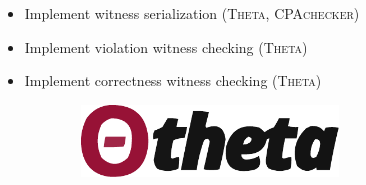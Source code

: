 
\begin{itemize}
    \item Implement witness serialization (\textsc{Theta}, \textsc{CPAchecker})
    \item Implement violation witness checking (\textsc{Theta})
    \item Implement correctness witness checking (\textsc{Theta})
\end{itemize}

\begin{figure}[H]
\centering
\begin{subfigure}{0.5\columnwidth}
\centering

\end{subfigure}%
\begin{subfigure}{0.5\columnwidth}
            \centering
            
\includegraphics[width=0.75\textwidth]{logos/theta-logo.pdf}
            
\end{subfigure}
\end{figure}